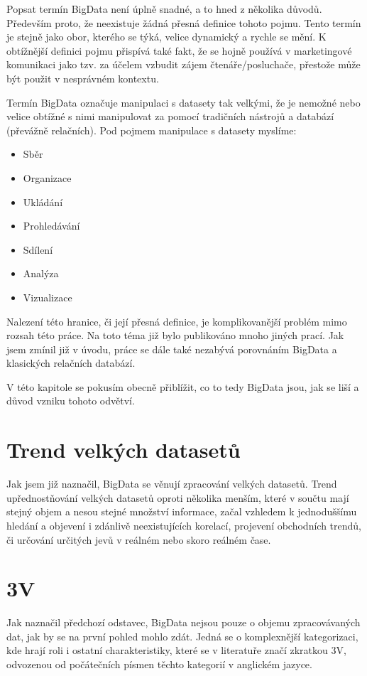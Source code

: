 

Popsat termín BigData není úplně snadné, a to hned z několika důvodů. Především proto, že neexistuje žádná přesná definice tohoto pojmu. Tento termín je stejně jako obor, kterého se týká, velice dynamický a rychle se mění. K obtížnější definici pojmu přispívá také fakt, že se hojně používá v marketingové komunikaci jako tzv.  za účelem vzbudit zájem čtenáře/posluchače, přestože může být použit v nesprávném kontextu.

Termín BigData označuje manipulaci s datasety tak velkými, že je nemožné nebo velice obtížné s nimi manipulovat za pomocí tradičních nástrojů a databází (převážně relačních). Pod pojmem manipulace s datasety myslíme:

\begin{itemize}
  \item Sběr
  \item Organizace
  \item Ukládání
 \item Prohledávání
 \item Sdílení
 \item Analýza
 \item Vizualizace
\end{itemize}

Nalezení této hranice, či její přesná definice, je komplikovanější problém mimo rozsah této práce. Na toto téma již bylo publikováno mnoho jiných prací. Jak jsem zmínil již v úvodu, práce se dále také nezabývá porovnáním BigData a klasických relačních databází. 

V této kapitole se pokusím obecně přiblížit, co to tedy BigData jsou, jak se liší a důvod vzniku tohoto odvětví.


\section{Trend velkých datasetů}
Jak jsem již naznačil, BigData se věnují zpracování velkých datasetů. Trend upřednostňování velkých datasetů oproti několika menším, které v součtu mají stejný objem a nesou stejné množství informace, začal vzhledem k jednoduššímu hledání a objevení i zdánlivě neexistujících korelací, projevení obchodních trendů, či určování určitých jevů v reálném nebo skoro reálném čase. %

\section{3V}
Jak naznačil předchozí odstavec, BigData nejsou pouze o objemu zpracovávaných dat, jak by se na první pohled mohlo zdát. Jedná se o komplexnější kategorizaci, kde hrají roli i ostatní charakteristiky, které se v literatuře značí zkratkou 3V, odvozenou od počátečních písmen těchto kategorií v anglickém jazyce. 

